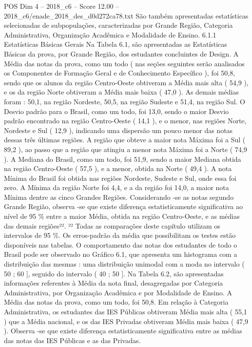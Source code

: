 \begin{textsample}{POS Dim 4 – 2018\_c6 – Score 12.00 – 2018\_c6/enade\_2018\_des\_d0d272ca78.txt}
São também apresentadas estatísticas selecionadas de subpopulações, caracterizadas por Grande Região, Categoria Administrativa, Organização Acadêmica e Modalidade de Ensino. 6.1.1 Estatísticas Básicas Gerais Na Tabela 6.1, são apresentadas as Estatísticas Básicas da prova, por Grande Região, dos estudantes concluintes de Design.
A Média das notas da prova, como um todo ( nas seções seguintes serão analisados os Componentes de Formação Geral e de Conhecimento Específico ), foi 50,8, sendo que os alunos da região Centro-Oeste obtiveram a Média mais alta ( 54,9 ), e os da região Norte obtiveram a Média mais baixa ( 47,0 ).
As demais médias foram : 50,1, na região Nordeste, 50,5, na região Sudeste e 51,4, na região Sul.
O Desvio padrão para o Brasil, como um todo, foi 13,0, sendo o maior Desvio padrão encontrado na região Centro-Oeste ( 14,1 ), e o menor, nas regiões Norte, Nordeste e Sul ( 12,9 ), indicando uma dispersão um pouco menor das notas dessas três últimas regiões.
A região que obteve a maior nota Máxima foi a Sul ( 89,2 ), ao passo que a região que atingiu a menor nota Máxima foi a Norte ( 74,9 ).
A Mediana do Brasil, como um todo, foi 51,9, sendo a maior Mediana obtida na região Centro-Oeste ( 57,5 ), e a menor, obtida na Norte ( 49,4 ).
A nota Mínima do Brasil foi obtida nas regiões Nordeste, Sudeste e Sul, onde essa foi zero.
A Mínima da região Norte foi 4,4, e a da região foi 14,0, a maior nota Mínima dentre as cinco Grandes Regiões.
Considerando -se as notas segundo Grande Região, observa -se que existe diferença estatisticamente significativa ao nível de 95 \% entre a maior Média, obtida na região Centro-Oeste, e as médias das demais regiões²². ²² Todas as comparações deste capítulo utilizam os intervalos de 95 \%.
Os erros-padrão da média que possibilitam os testes estão disponíveis nas tabelas.
O comportamento das notas dos estudantes de todo o Brasil pode ser observado no Gráfico 6.1, que apresenta um histograma com a distribuição das mesmas : uma distribuição unimodal com a moda no intervalo ( 50 ; 60 ], seguido do intervalo ( 40 ; 50 ].
Na Tabela 6.2, são apresentadas informações referentes à Média da nota final, desagregadas por Categoria Administrativa, por Organização Acadêmica e por Modalidade de Ensino.
A Média das notas da prova, como um todo, foi 50,8.
Em relação à Categoria Administrativa, os estudantes das IES Públicas obtiveram Média mais alta ( 55,1 ) que a Média nacional, e os das IES Privadas obtiveram Média mais baixa ( 47,9 ).
Observa -se que existe diferença estatisticamente significativa entre as médias das notas das IES Públicas e as das Privadas.

\end{textsample}
